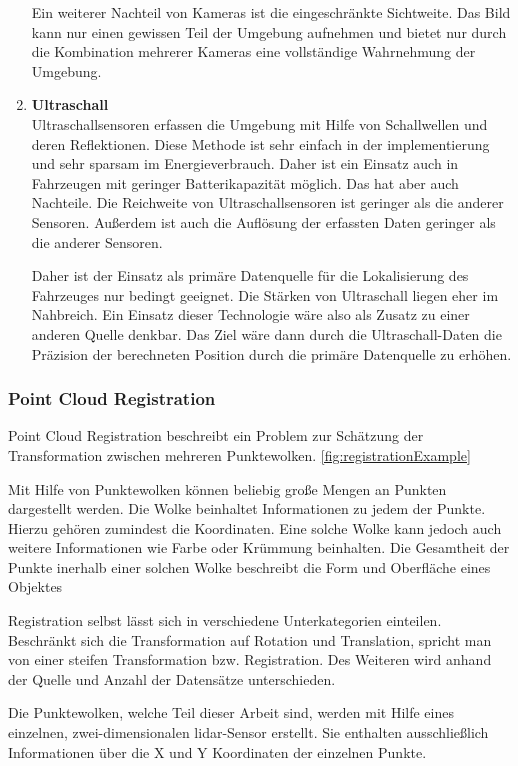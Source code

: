 \begin{enumerate}[leftmargin=*]
    Ein weiterer Nachteil von Kameras ist die eingeschränkte Sichtweite. 
    Das Bild kann nur einen gewissen Teil der Umgebung aufnehmen und bietet nur durch die Kombination mehrerer Kameras eine vollständige Wahrnehmung der Umgebung.


    \item \textbf{Ultraschall} \\
    Ultraschallsensoren erfassen die Umgebung mit Hilfe von Schallwellen und deren Reflektionen. 
    Diese Methode ist sehr einfach in der implementierung und sehr sparsam im Energieverbrauch. 
    Daher ist ein Einsatz auch in Fahrzeugen mit geringer Batterikapazität möglich.
    Das hat aber auch Nachteile. 
    Die Reichweite von Ultraschallsensoren ist geringer als die anderer Sensoren. 
    Außerdem ist auch die Auflösung der erfassten Daten geringer als die anderer Sensoren.

    Daher ist der Einsatz als primäre Datenquelle für die Lokalisierung des Fahrzeuges nur bedingt geeignet.
    Die Stärken von Ultraschall liegen eher im Nahbreich.
    Ein Einsatz dieser Technologie wäre also als Zusatz zu einer anderen Quelle denkbar. 
    Das Ziel wäre dann durch die Ultraschall-Daten die Präzision der berechneten Position durch die primäre Datenquelle zu erhöhen. 
\end{enumerate}

\subsubsection{Point Cloud Registration}
\label{pcl}
Point Cloud Registration beschreibt ein Problem zur Schätzung der Transformation zwischen mehreren Punktewolken. \ref{fig:registrationExample}

Mit Hilfe von Punktewolken können beliebig große Mengen an Punkten dargestellt werden.
Die Wolke beinhaltet Informationen zu jedem der Punkte.
Hierzu gehören zumindest die Koordinaten.
Eine solche Wolke kann jedoch auch weitere Informationen wie Farbe oder Krümmung beinhalten. 
Die Gesamtheit der Punkte inerhalb einer solchen Wolke beschreibt die Form und Oberfläche eines Objektes
\cite[chapters 2.2]{registration2021}

Registration selbst lässt sich in verschiedene Unterkategorien einteilen.
Beschränkt sich die Transformation auf Rotation und Translation, spricht man von einer steifen Transformation bzw. Registration.
Des Weiteren wird anhand der Quelle und Anzahl der Datensätze unterschieden.

Die Punktewolken, welche Teil dieser Arbeit sind, werden mit Hilfe eines einzelnen, zwei-dimensionalen \ac{lidar}-Sensor erstellt.
Sie enthalten ausschließlich Informationen über die X und Y Koordinaten der einzelnen Punkte.

